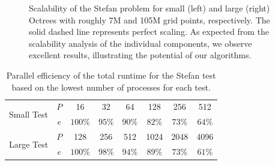 \begin{figure}
\centering
{}
\caption{Scalability of the Stefan problem for small (left) and large (right) Octrees with roughly 7M and 105M grid points, respectively. The solid dashed line represents perfect scaling. As expected from the scalability analysis of the individual components, we observe excellent results, illustrating the potential of our algorithms.}
\label{fig:stefan_scaling}
\end{figure}

\begin{table}
\centering
	\begin{tabular}{|l|c|cccccc|}
	\hline
	\multirow{2}{*}{Small Test} & $P$ & 16      & 32      & 64      & 128     & 256    & 512 \\ 	                            
	                            & $e$ & $100\%$ & $95\%$  & $90\%$  & $82\%$  & $73\%$ & $64\%$ \\
	\hline
	\multirow{2}{*}{Large Test} & $P$ & 128     & 256     & 512     & 1024    & 2048   & 4096 \\ 	                            
	                            & $e$ & $100\%$ & $98\%$  & $94\%$  & $89\%$  & $73\%$ & $61\%$ \\
	\hline
	\end{tabular}
	\caption{Parallel efficiency of the total runtime for the Stefan test based on the lowest number of processes for each test.}
	\label{tab:scaling_stefan} 
\end{table}

